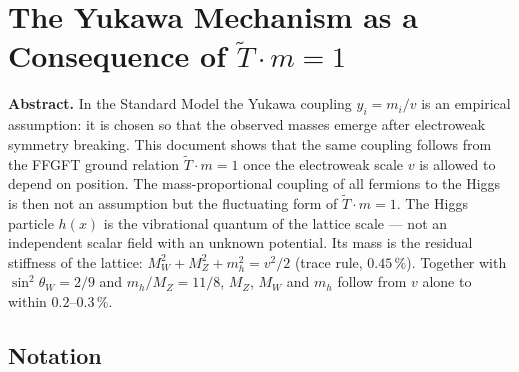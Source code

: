 \providecommand{\BM}{\textbf{[B]}}
\providecommand{\KM}{\textbf{[K]}}
\providecommand{\SM}{\textbf{[S]}}
\providecommand{\XM}{\textbf{[X]}}

\chapter*{The Yukawa Mechanism as a Consequence of $\tilde T\cdot m=1$}

{\small\noindent\textbf{Abstract.}\quad\ignorespaces
In the Standard Model the Yukawa coupling $y_i = m_i/v$ is an empirical
assumption: it is chosen so that the observed masses emerge after
electroweak symmetry breaking. This document shows that the same coupling
follows from the FFGFT ground relation $\tilde T\cdot m = 1$ once the
electroweak scale $v$ is allowed to depend on position. The
mass-proportional coupling of all fermions to the Higgs is then not an
assumption but the fluctuating form of $\tilde T\cdot m = 1$. The Higgs
particle $h(x)$ is the vibrational quantum of the lattice scale --- not an
independent scalar field with an unknown potential. Its mass is the
residual stiffness of the lattice: $M_W^2+M_Z^2+m_h^2 = v^2/2$ (trace rule,
$0.45\,\%$). Together with $\sin^2\theta_W = 2/9$ and $m_h/M_Z = 11/8$,
$M_Z$, $M_W$ and $m_h$ follow from $v$ alone to within $0.2$--$0.3\,\%$.
}\medskip

\section*{Notation}

\medskip


